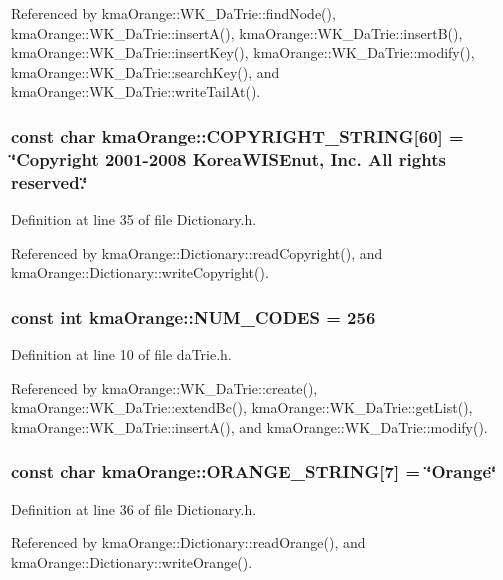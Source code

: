 Referenced by kmaOrange::WK\_\-DaTrie::findNode(), kmaOrange::WK\_\-DaTrie::insertA(), kmaOrange::WK\_\-DaTrie::insertB(), kmaOrange::WK\_\-DaTrie::insertKey(), kmaOrange::WK\_\-DaTrie::modify(), kmaOrange::WK\_\-DaTrie::searchKey(), and kmaOrange::WK\_\-DaTrie::writeTailAt().\hypertarget{namespacekmaOrange_e637169c5121cccbf64b380a74691660}{
\subsubsection[{COPYRIGHT\_\-STRING}]{\setlength{\rightskip}{0pt plus 5cm}const char {\bf kmaOrange::COPYRIGHT\_\-STRING}\mbox{[}60\mbox{]} = \char`\"{}Copyright 2001-2008 KoreaWISEnut, Inc. All rights reserved.\char`\"{}}}
\label{namespacekmaOrange_e637169c5121cccbf64b380a74691660}




Definition at line 35 of file Dictionary.h.

Referenced by kmaOrange::Dictionary::readCopyright(), and kmaOrange::Dictionary::writeCopyright().\hypertarget{namespacekmaOrange_59d9d6af392d4b3c47dd7edf4bf78818}{
\subsubsection[{NUM\_\-CODES}]{\setlength{\rightskip}{0pt plus 5cm}const int {\bf kmaOrange::NUM\_\-CODES} = 256}}
\label{namespacekmaOrange_59d9d6af392d4b3c47dd7edf4bf78818}




Definition at line 10 of file daTrie.h.

Referenced by kmaOrange::WK\_\-DaTrie::create(), kmaOrange::WK\_\-DaTrie::extendBc(), kmaOrange::WK\_\-DaTrie::getList(), kmaOrange::WK\_\-DaTrie::insertA(), and kmaOrange::WK\_\-DaTrie::modify().\hypertarget{namespacekmaOrange_cef08b622a58aea82551e96b4d1dec5c}{
\subsubsection[{ORANGE\_\-STRING}]{\setlength{\rightskip}{0pt plus 5cm}const char {\bf kmaOrange::ORANGE\_\-STRING}\mbox{[}7\mbox{]} = \char`\"{}Orange\char`\"{}}}
\label{namespacekmaOrange_cef08b622a58aea82551e96b4d1dec5c}




Definition at line 36 of file Dictionary.h.

Referenced by kmaOrange::Dictionary::readOrange(), and kmaOrange::Dictionary::writeOrange().